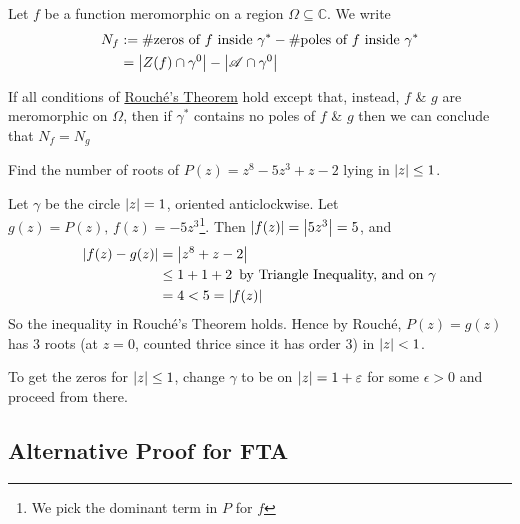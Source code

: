 \documentclass[11pt, oneside]{book}
\begin{document}
\begin{note}[Notation]
  Let $f$ be a function meromorphic on a region $\Omega \subseteq \mathbb{C}$. We write
  \begin{align*}
    N_f &:= \#\text{zeros of } f \text{ inside } \gamma^* - \#\text{poles of } f \text{ inside } \gamma^* \\
      &= \left|Z(f) \cap \gamma^0\right| - \left|\mathscr{A} \cap \gamma^0\right|
  \end{align*}
\end{note}

\begin{remark}
  If all conditions of \hyperref[thm:rouche_s_theorem]{Rouch\'e's Theorem} hold except that, instead, $f$ \& $g$ are meromorphic on $\Omega$, then if $\gamma^*$ contains no poles of $f$ \& $g$ then we can conclude that $N_f = N_g$
\end{remark}

\begin{ex}
  Find the number of roots of $P(z) = z^8 - 5z^3 + z - 2$ lying in $\left|z\right| \leq 1$.

  \begin{solution}
    Let $\gamma$ be the circle $\left|z\right| = 1$, oriented anticlockwise. Let $g(z) = P(z), \, f(z) = -5z^3$\footnote{We pick the dominant term in $P$ for $f$}. Then $\left|f(z)\right| = \left|5z^3\right| = 5$, and
    \begin{align*}
      \left|f(z) - g(z)\right| &= \left|z^8 + z - 2\right| \\
        &\leq 1 + 1 + 2 \enspace \text{by Triangle Inequality, and on } \gamma \\
        &= 4 < 5 = \left|f(z)\right|
    \end{align*}
    So the inequality in Rouch\'e's Theorem holds. Hence by Rouch\'e, $P(z) = g(z)$ has $3$ roots (at $z = 0$, counted thrice since it has order $3$) in $\left|z\right| < 1$.

    To get the zeros for $\left|z\right| \leq 1$, change $\gamma$ to be on $\left|z\right| = 1 + \varepsilon$ for some $\epsilon > 0$ and proceed from there.
  \end{solution}
\end{ex}


\subsection{Alternative Proof for FTA} %
\label{sub:alternative_proof_for_fta}
\end{document}
